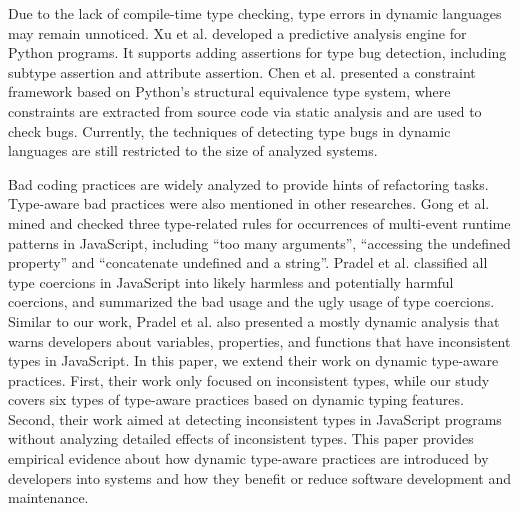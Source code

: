Due to the lack of compile-time type checking, type errors in dynamic languages may remain unnoticed. Xu et al. \cite{b15} developed a predictive analysis engine for Python programs. It supports adding assertions for type bug detection, including subtype assertion and attribute assertion. Chen et al.\cite{b17} presented a constraint framework based on Python's structural equivalence type system, where constraints are extracted from source code via static analysis and are used to check bugs. Currently, the techniques of detecting type bugs in dynamic languages are still restricted to the size of analyzed systems.

Bad coding practices are widely analyzed to provide hints of refactoring tasks. Type-aware bad practices were also mentioned in other researches\cite{b11,b2,b1}. 
Gong et al.\cite{b11} mined and checked three type-related rules for occurrences of multi-event runtime patterns in JavaScript, including  ``too many arguments'', ``accessing the undefined property'' and ``concatenate undefined and a string''. 
Pradel et al. \cite{b2} classified all type coercions in JavaScript into likely harmless and potentially harmful coercions, and summarized the bad usage and the ugly usage of type coercions. 
Similar to our work, Pradel et al. \cite{b1} also presented a mostly dynamic analysis that warns developers about variables, properties, and functions that have inconsistent types in JavaScript. In this paper, we extend their work on dynamic type-aware practices. First, their work only focused on inconsistent types, while our study covers six types of type-aware practices based on dynamic typing features. Second, their work aimed at detecting inconsistent types in JavaScript programs without analyzing detailed effects of inconsistent types. This paper provides empirical evidence about how dynamic type-aware practices are introduced by developers into systems and how they benefit or reduce software development and maintenance.







	

